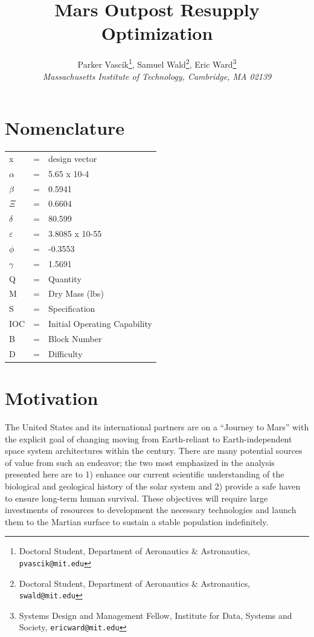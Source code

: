 \documentclass[]{aiaa-pretty}
\author[Vascik, Wald, and Ward]{ %
Parker Vascik\thanks{Doctoral Student, Department of Aeronautics \& Astronautics, \texttt{pvascik@mit.edu}},
Samuel Wald\thanks{Doctoral Student, Department of Aeronautics \& Astronautics, \texttt{swald@mit.edu}},
Eric Ward\thanks{Systems Design and Management Fellow, Institute for Data, Systems and Society, \texttt{ericward@mit.edu}}\\
\textit{Massachusetts Institute of Technology, Cambridge, MA 02139}}
\title{Mars Outpost Resupply Optimization}
\begin{document}
\maketitle

\section*{Nomenclature}
\begin{table}[h!]
\label{tab:Nom}
\begin{tabular}{lll}
x   & = & design vector                \\
\( \alpha \)   & = & 5.65 x 10-4                  \\
\( \beta \)   & = & 0.5941                       \\
\( \Xi \)   & = & 0.6604                       \\
\( \delta \)   & = & 80.599                       \\
\( \varepsilon \)   & = & 3.8085 x 10-55               \\
\( \phi \)   & = & -0.3553                      \\
\( \gamma \)   & = & 1.5691                       \\
Q   & = & Quantity                     \\
M   & = & Dry Mass (lbs)               \\
S   & = & Specification                \\
IOC & = & Initial Operating Capability \\
B   & = & Block Number                 \\
D   & = & Difficulty                  
\end{tabular}
\end{table}


\section{Motivation}
\label{sec:Motivation}
The United States and its international partners are on a “Journey to Mars” with the explicit goal of changing moving from Earth-reliant to Earth-independent space system architectures within the century. \cite{craig2015pioneering} There are many potential sources of value from such an endeavor; the two most emphasized in the analysis presented here are to 1) enhance our current scientific understanding of the biological and geological history of the solar system and 2) provide a safe haven to ensure long-term human survival. \cite{NRC2014} These objectives will require large investments of resources to development the necessary technologies and launch them to the Martian surface to sustain a stable population indefinitely. 
\end{document}
